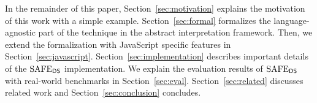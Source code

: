 In the remainder of this paper, Section~\ref{sec:motivation} explains the
motivation of this work with a simple example.  Section~\ref{sec:formal}
formalizes the language-agnostic part of the technique in the abstract
interpretation framework.  Then, we extend the formalization with
JavaScript specific features in Section~\ref{sec:javascript}.
Section~\ref{sec:implementation} describes important details of the
$\text{SAFE}_{\textsf{DS}}$ implementation.  We explain the evaluation results of $\text{SAFE}_{\textsf{DS}}$
with real-world benchmarks in Section~\ref{sec:eval}.
Section~\ref{sec:related} discusses related work and
Section~\ref{sec:conclusion} concludes.
